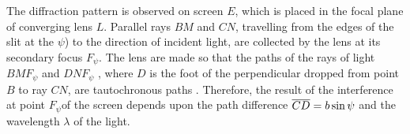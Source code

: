 The diffraction pattern is observed on screen $E$, which is placed in the focal plane of converging lens $L$. Parallel
rays $BM$ and $CN$, travelling from the edges of the slit at the  $\psi$) to the direction of incident light, are collected by the lens at its secondary focus $F_{\psi}$. The lens are made so that the paths of the rays of light $BMF_{\psi}$ and $DNF_{\psi}$ , where $D$ is the foot of the perpendicular dropped from point $B$ to ray $CN$, are tautochronous paths . Therefore, the result of the interference at point $F_{\psi}$of the screen depends upon the path difference $\overline{CD} = b \sin \psi$ and the wavelength $\lambda$ of the light.
